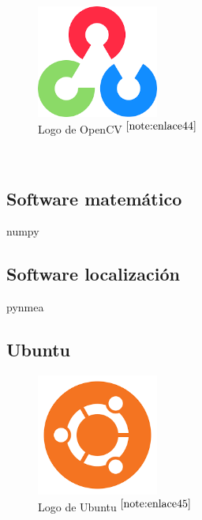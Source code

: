 \begin{figure} [h!]
	\begin{center}
		\includegraphics[width=4cm]{figs/opencv.png}
	\end{center}
	\caption{Logo de OpenCV $^{\ref{note:enlace44}}$} 
	\label{fig:opencv}
\end{figure}\

\setcounter{footnote}{44} %

\subsection{Software matemático}

numpy

\subsection{Software localización}
pynmea

\subsection{Ubuntu}

\begin{figure} [h!]
	\begin{center}
		\includegraphics[width=4cm]{figs/ubuntu.png}
	\end{center}
	\caption{Logo de Ubuntu $^{\ref{note:enlace45}}$} 
	\label{fig:ubuntu}
\end{figure}\

\setcounter{footnote}{45} %

